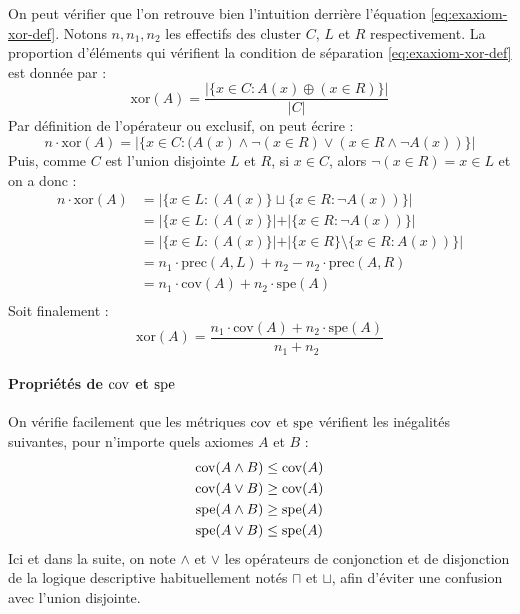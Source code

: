 On peut vérifier que l'on retrouve bien l'intuition derrière l'équation \ref{eq:exaxiom-xor-def}. Notons $n, n_1, n_2$ les effectifs des cluster $C$, $L$ et $R$ respectivement. La proportion d'éléments qui vérifient la condition de séparation \ref{eq:exaxiom-xor-def} est donnée par :
\begin{equation}
    \text{xor}(A) = \frac{| \{x \in C : A(x) \oplus (x \in R) \}|}{| C |}
\end{equation}
Par définition de l'opérateur ou exclusif, on peut écrire :
\begin{equation}
    n \cdot \text{xor}(A) = |\{x \in C: (A(x) \land \neg (x \in R) \lor (x \in R \land \neg A(x)) \}|
\end{equation}
Puis, comme $C$ est l'union disjointe $L$ et $R$, si $x \in C$, alors $\neg (x \in R) = x \in L$ et on a donc :
\begin{align*}
    n \cdot \text{xor}(A) &= |\{x \in L: (A(x)\} \sqcup \{x \in R : \neg A(x)) \}| \\
    &= |\{x \in L: (A(x)\} | + | \{x \in R : \neg A(x)) \}|  \\
    &= |\{x \in L: (A(x)\} | + | \{x \in R \} \setminus \{x \in R : A(x)) \}| \\
    &= n_1 \cdot \text{prec}(A, L) + n_2 - n_2 \cdot \text{prec}(A, R) \\
    &= n_1 \cdot \text{cov}(A) + n_2 \cdot \text{spe}(A) \\
\end{align*}
Soit finalement :
\begin{equation}
    \text{xor}(A) = \frac{n_1 \cdot \text{cov}(A) + n_2 \cdot \text{spe}(A)}{n_1 + n_2}
\end{equation}

\paragraph{Propriétés de $\operatorname{cov}$ et $\operatorname{spe}$}

On vérifie facilement que les métriques $\operatorname{cov}$ et $\operatorname{spe}$ vérifient les inégalités suivantes, pour n'importe quels axiomes $A$ et $B$ :
\begin{align}
    \operatorname{cov}(A \land B) & \leq \operatorname{cov}(A) \\
    \operatorname{cov}(A \lor B) & \geq \operatorname{cov}(A)  \label{eq:cov-disjunct} \\
    \operatorname{spe}(A \land B) & \geq \operatorname{spe}(A) \label{eq:cov-conjunct} \\
    \operatorname{spe}(A \lor B) & \leq \operatorname{spe}(A)
\end{align}
Ici et dans la suite, on note $\land$ et $\lor$ les opérateurs de conjonction et de disjonction de la logique descriptive habituellement notés $\sqcap$ et $\sqcup$, afin d'éviter une confusion avec l'union disjointe.

